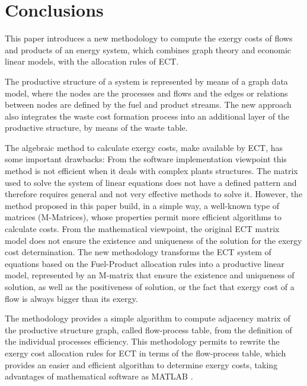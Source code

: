 \documentclass{ecos}
\begin{document}
\section{Conclusions}
This paper introduces a new methodology to compute the exergy costs of flows and products of an energy system, which combines graph theory and economic linear models, with the allocation rules of ECT.

The productive structure of a system is represented by means of a graph data model, where the nodes are the processes and flows and the edges or relations between nodes are defined by the fuel and product streams. The new approach also integrates the waste cost formation process into an additional layer of the productive structure, by means of the waste table.

The algebraic method to calculate exergy costs, make available by ECT, has some important drawbacks:
From the software implementation viewpoint this method is not efficient when it deals with complex plants structures. The matrix used to solve the system of linear equations does not have a defined pattern and therefore requires general and not very effective methods to solve it. However, the method proposed in this paper build, in a simple way, a well-known type of matrices (M-Matrices), whose properties permit more efficient algorithms to calculate costs. From the mathematical viewpoint, the original ECT matrix model does not ensure the existence and uniqueness of the solution for the exergy cost determination. The new methodology transforms the ECT system of equations based on the Fuel-Product allocation rules into a productive linear model, represented by an M-matrix that ensure the existence and uniqueness of solution, as well as the positiveness of solution, or the fact that exergy cost of a flow is always bigger than its exergy.

The methodology provides a simple algorithm to compute adjacency matrix of the productive structure graph, called flow-process table, from the definition of the individual processes efficiency. This methodology permits to rewrite the exergy cost allocation rules for ECT in terms of the flow-process table, which provides an easier and efficient algorithm to determine exergy costs, taking advantages of  mathematical software as MATLAB \circledR.
\end{document}
